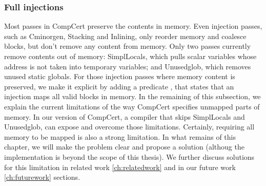 %

   
   
\subsubsection{Full injections} Most passes in CompCert preserve the contents in memory. Even injection passes, such as Cminorgen, Stacking and Inlining, only reorder memory and coalesce blocks, but don't remove any content from memory. Only two passes currently remove contents out of memory: SimplLocals, which pulls scalar variables whose address is not taken into temporary variables; and Unusedglob, which removes unused static globals. For those injection passes where memory content is preserved, we make it explicit by adding a predicate , that states that an injection maps all valid blocks in memory. In the remaining of this subsection, we explain the current limitations of the way CompCert specifies unmapped parts of memory. In our version of CompCert, a compiler that skips SimplLocals and Unusedglob, can expose  and overcome those limitations. Certainly, requiring all memory to be mapped is also a strong limitation. In what remains of this chapter, we will make the problem clear and propose a solution (althoug the implementation is beyond the scope of this thesis). We further discuss solutions for this limitation in related work \ref{ch:relatedwork} and in our future work \ref{ch:futurework} sections.

